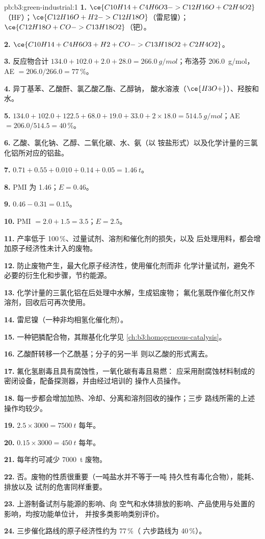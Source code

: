 \begin{solution}{pb:b3:green-industrial:1}
\textbf{1.} $\ce{C10H14 + C4H6O3 -> C12H16O + C2H4O2}$（HF）；$\ce{C12H16O + H2 -> C12H18O}$（雷尼镍）；
$\ce{C12H18O + CO -> C13H18O2}$（钯）。

\textbf{2.} $\ce{C10H14 + C4H6O3 + H2 + CO -> C13H18O2 + C2H4O2}$。

\textbf{3.} 反应物合计 $134.0 + 102.0 + 2.0 + 28.0 = \qty{266.0}{g/mol}$；布洛芬 \qty{206.0}{g/mol}，AE $= 206.0/266.0 = 77$\,\%。

\textbf{4.} 异丁基苯、乙酸酐、氯乙酸乙酯、乙醇钠，
酸水溶液（$\ce{H3O+}$）、羟胺和水。

\textbf{5.} $134.0 + 102.0 + 122.5 + 68.0 + 19.0 + 33.0 + 2 \times 18.0 = \qty{514.5}{g/mol}$；AE $= 206.0/514.5 = 40$\,\%。

\textbf{6.} 乙酸、氯化钠、乙醇、二氧化碳、水、氨（以
铵盐形式）以及化学计量的三氯化铝所对应的铝盐。

\textbf{7.} $0.71 + 0.55 + 0.010 + 0.14 + 0.05 = \qty{1.46}{t}$。

\textbf{8.} PMI 为 1.46；$E = 0.46$。

\textbf{9.} $0.46 - 0.31 = 0.15$。

\textbf{10.} PMI $= 2.0 + 1.5 = 3.5$；$E = 2.5$。

\textbf{11.} 产率低于 100\,\%、过量试剂、溶剂和催化剂的损失，以及
后处理用料，都会增加原子经济性未计入的废物。

\textbf{12.} 防止废物产生，最大化原子经济性，使用催化剂而非
化学计量试剂，避免不必要的衍生化和步骤，节约能源。

\textbf{13.} 化学计量的三氯化铝在后处理中水解，生成铝废物；
氟化氢既作催化剂又作溶剂，回收后可再次使用。

\textbf{14.} 雷尼镍（一种非均相氢化催化剂）。

\textbf{15.} 一种钯膦配合物，其羰基化化学见
\cref{ch:b3:homogeneous-catalysis}。

\textbf{16.} 乙酸酐转移一个乙酰基；分子的另一半
则以乙酸的形式离去。

\textbf{17.} 氟化氢剧毒且具有腐蚀性，一氧化碳有毒且易燃：
应采用耐腐蚀材料制成的密闭设备，配备探测器，并由经过培训的
操作人员操作。

\textbf{18.} 每一步都会增加加热、冷却、分离和溶剂回收的操作；三步
路线所需的上述操作均较少。

\textbf{19.} $2.5 \times 3000 = \qty{7500}{t}$ 每年。

\textbf{20.} $0.15 \times 3000 = \qty{450}{t}$ 每年。

\textbf{21.} 每年约可减少 \qty{7000}{t} 废物。

\textbf{22.} 否。废物的性质很重要（一吨盐水并不等于一吨
持久性有毒化合物），能耗、排放以及
试剂的危害同样重要。

\textbf{23.} 上游制备试剂与能源的影响、向
空气和水体排放的影响、产品使用与处置的影响，均按功能单位计，
并按多类影响类别评价。

\textbf{24.} 三步催化路线的原子经济性约为 77\,\%（
六步路线为 40\,\%）。
\end{solution}
